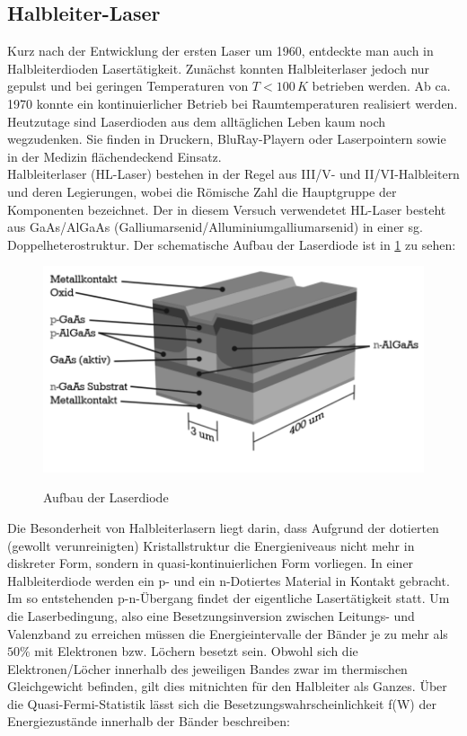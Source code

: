 \documentclass[twoside,colorback,accentcolor=tud4c,11pt]{tudreport}
\begin{document}
\subsection{Halbleiter-Laser}
Kurz nach der Entwicklung der ersten Laser um 1960, entdeckte man auch in Halbleiterdioden Lasertätigkeit. Zunächst konnten Halbleiterlaser jedoch nur gepulst und bei geringen Temperaturen von $T<100\,\si{K}$ betrieben werden. Ab ca. 1970 konnte ein kontinuierlicher Betrieb bei Raumtemperaturen realisiert werden. Heutzutage sind Laserdioden aus dem alltäglichen Leben kaum noch wegzudenken. Sie finden in Druckern, BluRay-Playern oder Laserpointern sowie in der Medizin flächendeckend Einsatz.\\
Halbleiterlaser (HL-Laser) bestehen in der Regel aus III/V- und II/VI-Halbleitern und deren Legierungen, wobei die Römische Zahl die Hauptgruppe der Komponenten bezeichnet. Der in diesem Versuch verwendetet HL-Laser besteht aus GaAs/AlGaAs (Galliumarsenid/Alluminiumgalliumarsenid) in einer sg. Doppelheterostruktur. Der schematische Aufbau der Laserdiode ist in \ref{diau} zu sehen:
\begin{figure}[H]
\centering
   	\begin{minipage}[b]{0.6\textwidth}
   	\includegraphics[width=\textwidth]{graphics/diodaufb.PNG}
  	\label{diau}
   	\end{minipage}
\caption{Aufbau der Laserdiode}\cite{anl} 	
\end{figure}
Die Besonderheit von Halbleiterlasern liegt darin, dass Aufgrund der dotierten (gewollt verunreinigten) Kristallstruktur die Energieniveaus nicht mehr in diskreter Form, sondern in quasi-kontinuierlichen Form vorliegen. In einer Halbleiterdiode werden ein p- und ein n-Dotiertes Material in Kontakt gebracht. Im so entstehenden p-n-Übergang findet der eigentliche Lasertätigkeit statt. Um die Laserbedingung, also eine Besetzungsinversion zwischen Leitungs- und Valenzband zu erreichen müssen die Energieintervalle der Bänder je zu mehr als $50\%$ mit Elektronen bzw. Löchern besetzt sein. Obwohl sich die Elektronen/Löcher innerhalb des jeweiligen Bandes zwar im thermischen Gleichgewicht befinden, gilt dies mitnichten für den Halbleiter als Ganzes. Über die Quasi-Fermi-Statistik lässt sich die Besetzungswahrscheinlichkeit f(W) der Energiezustände innerhalb der Bänder beschreiben:
\end{document}
